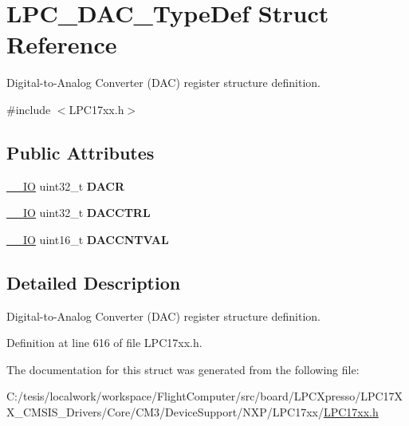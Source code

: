 \hypertarget{struct_l_p_c___d_a_c___type_def}{\section{\-L\-P\-C\-\_\-\-D\-A\-C\-\_\-\-Type\-Def \-Struct \-Reference}
\label{struct_l_p_c___d_a_c___type_def}
}


\-Digital-\/to-\/\-Analog \-Converter (\-D\-A\-C) register structure definition.  




{\ttfamily \#include $<$\-L\-P\-C17xx.\-h$>$}

\subsection*{\-Public \-Attributes}
\begin{DoxyCompactItemize}
\item 
\hypertarget{struct_l_p_c___d_a_c___type_def_aeca5925957d02f483828953f108d8472}{\hyperlink{group___c_m_s_i_s__core__definitions_gaec43007d9998a0a0e01faede4133d6be}{\-\_\-\-\_\-\-I\-O} uint32\-\_\-t {\bfseries \-D\-A\-C\-R}}\label{struct_l_p_c___d_a_c___type_def_aeca5925957d02f483828953f108d8472}

\item 
\hypertarget{struct_l_p_c___d_a_c___type_def_a98d077f22452e939c5393ba58460165d}{\hyperlink{group___c_m_s_i_s__core__definitions_gaec43007d9998a0a0e01faede4133d6be}{\-\_\-\-\_\-\-I\-O} uint32\-\_\-t {\bfseries \-D\-A\-C\-C\-T\-R\-L}}\label{struct_l_p_c___d_a_c___type_def_a98d077f22452e939c5393ba58460165d}

\item 
\hypertarget{struct_l_p_c___d_a_c___type_def_ae31627b66bf9b21cdfd825b81d65b252}{\hyperlink{group___c_m_s_i_s__core__definitions_gaec43007d9998a0a0e01faede4133d6be}{\-\_\-\-\_\-\-I\-O} uint16\-\_\-t {\bfseries \-D\-A\-C\-C\-N\-T\-V\-A\-L}}\label{struct_l_p_c___d_a_c___type_def_ae31627b66bf9b21cdfd825b81d65b252}

\end{DoxyCompactItemize}


\subsection{\-Detailed \-Description}
\-Digital-\/to-\/\-Analog \-Converter (\-D\-A\-C) register structure definition. 

\-Definition at line 616 of file \-L\-P\-C17xx.\-h.



\-The documentation for this struct was generated from the following file\-:\begin{DoxyCompactItemize}
\item 
\-C\-:/tesis/localwork/workspace/\-Flight\-Computer/src/board/\-L\-P\-C\-Xpresso/\-L\-P\-C17\-X\-X\-\_\-\-C\-M\-S\-I\-S\-\_\-\-Drivers/\-Core/\-C\-M3/\-Device\-Support/\-N\-X\-P/\-L\-P\-C17xx/\hyperlink{_l_p_c17xx_8h}{\-L\-P\-C17xx.\-h}\end{DoxyCompactItemize}
